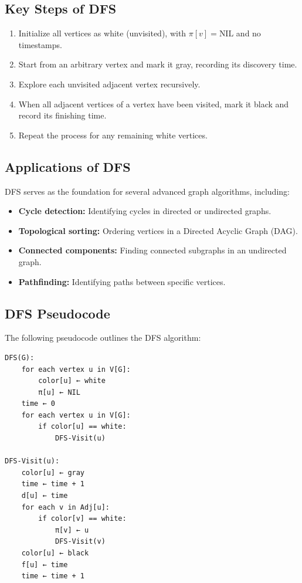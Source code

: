 \subsection{Key Steps of DFS}
\begin{enumerate}
    \item Initialize all vertices as white (unvisited), with \(\pi[v] = \text{NIL}\) and no timestamps.
    \item Start from an arbitrary vertex and mark it gray, recording its discovery time.
    \item Explore each unvisited adjacent vertex recursively.
    \item When all adjacent vertices of a vertex have been visited, mark it black and record its finishing time.
    \item Repeat the process for any remaining white vertices.
\end{enumerate}

\subsection{Applications of DFS}
DFS serves as the foundation for several advanced graph algorithms, including:
\begin{itemize}
    \item \textbf{Cycle detection:} Identifying cycles in directed or undirected graphs.
    \item \textbf{Topological sorting:} Ordering vertices in a Directed Acyclic Graph (DAG).
    \item \textbf{Connected components:} Finding connected subgraphs in an undirected graph.
    \item \textbf{Pathfinding:} Identifying paths between specific vertices.
\end{itemize}

\subsection{DFS Pseudocode}
The following pseudocode outlines the DFS algorithm:
\begin{verbatim}
DFS(G):
    for each vertex u in V[G]:
        color[u] ← white
        π[u] ← NIL
    time ← 0
    for each vertex u in V[G]:
        if color[u] == white:
            DFS-Visit(u)

DFS-Visit(u):
    color[u] ← gray
    time ← time + 1
    d[u] ← time
    for each v in Adj[u]:
        if color[v] == white:
            π[v] ← u
            DFS-Visit(v)
    color[u] ← black
    f[u] ← time
    time ← time + 1
\end{verbatim}

